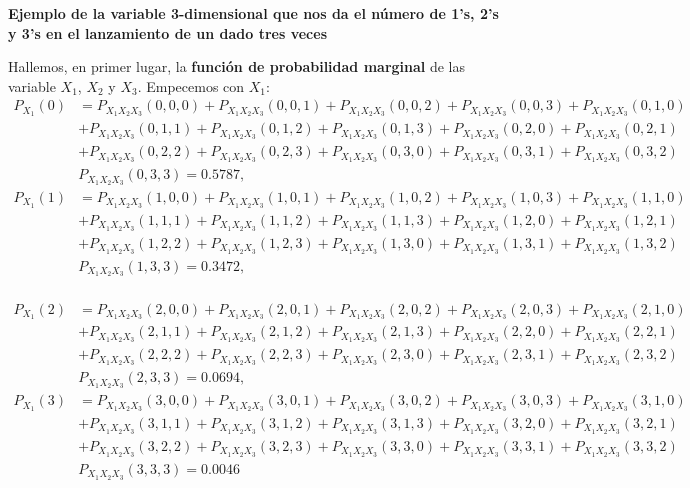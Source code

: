 \documentclass[]{book}
\begin{document}
\textbf{Ejemplo de la variable 3-dimensional que nos da el número de 1's, 2's y 3's en el lanzamiento de un dado tres veces}

Hallemos, en primer lugar, la \textbf{función de probabilidad marginal} de las variable \(X_1\), \(X_2\) y \(X_3\). Empecemos con \(X_1\):
\[
\begin{array}{rl}
P_{X_1}(0) & = P_{X_1X_2X_3}(0,0,0)+P_{X_1X_2X_3}(0,0,1)+P_{X_1X_2X_3}(0,0,2)+P_{X_1X_2X_3}(0,0,3)+P_{X_1X_2X_3}(0,1,0) \\ & +P_{X_1X_2X_3}(0,1,1)+P_{X_1X_2X_3}(0,1,2)+P_{X_1X_2X_3}(0,1,3)+P_{X_1X_2X_3}(0,2,0)+P_{X_1X_2X_3}(0,2,1)\\ &
+P_{X_1X_2X_3}(0,2,2)+P_{X_1X_2X_3}(0,2,3)+P_{X_1X_2X_3}(0,3,0)+P_{X_1X_2X_3}(0,3,1)+P_{X_1X_2X_3}(0,3,2)\\ &
P_{X_1X_2X_3}(0,3,3)=0.5787,\\
P_{X_1}(1) & = P_{X_1X_2X_3}(1,0,0)+P_{X_1X_2X_3}(1,0,1)+P_{X_1X_2X_3}(1,0,2)+P_{X_1X_2X_3}(1,0,3)+P_{X_1X_2X_3}(1,1,0) \\ & +P_{X_1X_2X_3}(1,1,1)+P_{X_1X_2X_3}(1,1,2)+P_{X_1X_2X_3}(1,1,3)+P_{X_1X_2X_3}(1,2,0)+P_{X_1X_2X_3}(1,2,1)\\ &
+P_{X_1X_2X_3}(1,2,2)+P_{X_1X_2X_3}(1,2,3)+P_{X_1X_2X_3}(1,3,0)+P_{X_1X_2X_3}(1,3,1)+P_{X_1X_2X_3}(1,3,2)\\ &
P_{X_1X_2X_3}(1,3,3)=0.3472,\\
\end{array}
\]

\[
\begin{array}{rl}
P_{X_1}(2) & = P_{X_1X_2X_3}(2,0,0)+P_{X_1X_2X_3}(2,0,1)+P_{X_1X_2X_3}(2,0,2)+P_{X_1X_2X_3}(2,0,3)+P_{X_1X_2X_3}(2,1,0) \\ & +P_{X_1X_2X_3}(2,1,1)+P_{X_1X_2X_3}(2,1,2)+P_{X_1X_2X_3}(2,1,3)+P_{X_1X_2X_3}(2,2,0)+P_{X_1X_2X_3}(2,2,1)\\ &
+P_{X_1X_2X_3}(2,2,2)+P_{X_1X_2X_3}(2,2,3)+P_{X_1X_2X_3}(2,3,0)+P_{X_1X_2X_3}(2,3,1)+P_{X_1X_2X_3}(2,3,2)\\ &
P_{X_1X_2X_3}(2,3,3)=0.0694,\\
P_{X_1}(3) & = P_{X_1X_2X_3}(3,0,0)+P_{X_1X_2X_3}(3,0,1)+P_{X_1X_2X_3}(3,0,2)+P_{X_1X_2X_3}(3,0,3)+P_{X_1X_2X_3}(3,1,0) \\ & +P_{X_1X_2X_3}(3,1,1)+P_{X_1X_2X_3}(3,1,2)+P_{X_1X_2X_3}(3,1,3)+P_{X_1X_2X_3}(3,2,0)+P_{X_1X_2X_3}(3,2,1)\\ &
+P_{X_1X_2X_3}(3,2,2)+P_{X_1X_2X_3}(3,2,3)+P_{X_1X_2X_3}(3,3,0)+P_{X_1X_2X_3}(3,3,1)+P_{X_1X_2X_3}(3,3,2)\\ &
P_{X_1X_2X_3}(3,3,3)=0.0046
\end{array}
\]
\end{document}

